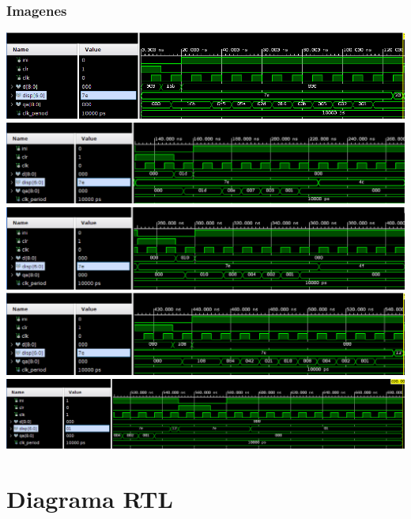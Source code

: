 \documentclass[8pt,executivepaper]{article}
\begin{document}
\subsubsection{Imagenes}
\begin{center}
  \includegraphics[scale=0.33]{img/asm-1.png}\\
  \includegraphics[scale=0.33]{img/asm-2.png}\\
  \includegraphics[scale=0.33]{img/asm-3.png}\\
  \includegraphics[scale=0.33]{img/asm-4.png}\\
  \includegraphics[scale=0.33]{img/asm-5.png}
\end{center}

\section{Diagrama RTL}
\end{document}
